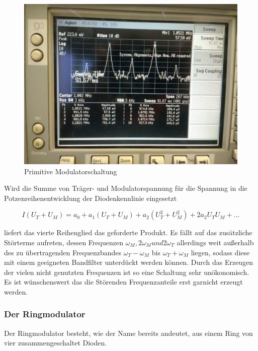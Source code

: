 \begin{figure}
	\centering
	\includegraphics[width=\textwidth]{img/Aufgabenteil_b.jpg}
	\caption{Primitive Modulatorschaltung}
	\label{abb:simpleMod}
\end{figure}

Wird die Summe von Träger- und Modulatorspannung für die Spannung in die Potzenreihenentwicklung der Diodenkennlinie eingesetzt

\begin{equation}
I(U_T + U_M) = a_0 + a_1(U_T + U_M) + a_2(U_T^2 + U_M^2) + 2a_2 U_T U_M + ...
\end{equation}

liefert das vierte Reihenglied das geforderte Produkt. Es fällt auf das zusätzliche Störterme aufreten, dessen Frequenzen  $\omega_M, 2\omega_M und 2\omega_T$ allerdings weit außerhalb des zu übertragenden Frequenzbandes $\omega_T - \omega_M$ bis $\omega_T + \omega_M$ liegen, sodass diese mit einem geeigneten Bandfilter unterdückt werden können.
Durch das Erzeugen der vielen nicht genutzten Frequenzen ist so eine Schaltung sehr unökonomisch. Es ist wünschenswert das die Störenden Frequenzanteile erst garnicht erzeugt werden.

\subsubsection{Der Ringmodulator}
Der Ringmodulator besteht, wie der Name bereits andeutet, aus einem Ring von vier zusammengeschaltet Dioden.

